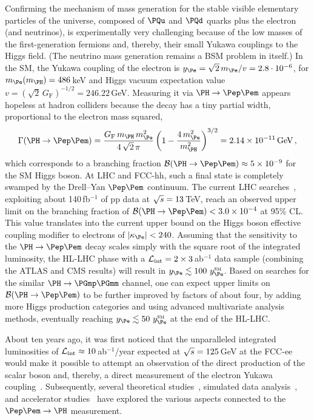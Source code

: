 Confirming the mechanism of mass generation for the stable visible elementary particles of the universe, 
composed of $\PQu$ and $\PQd$ quarks plus the electron (and neutrinos), 
is experimentally very challenging because of the low masses of the first-generation fermions and, thereby, 
their small Yukawa couplings to the Higgs field. (The neutrino mass generation remains a BSM problem in itself.) 
In the SM, the Yukawa coupling of the electron is $y_{\Pe} = \sqrt{2} \, m_{\Pe}/v = 2.8 \cdot 10^{-6}$, 
for $m_{\Pe}(m_{\PH}) = 486$\,keV and Higgs vacuum expectation value $v = ( \sqrt{2} \, G_\mathrm{F} )^{-1/2} = 246.22$\,GeV.
Measuring it via $\PH \to \Pep\Pem$ appears hopeless at hadron colliders because the decay has a tiny partial width, 
proportional to the electron mass squared,
\begin{equation}
\Gamma(\PH\to\Pep\Pem) = 
\frac{{G_\mathrm{F}} \, m_{\PH} \, m_{\Pe}^2} {4\,\sqrt{2}\,\pi}
\left(1-\frac{4\,m^2_{\Pe}}{m^2_{\PH}}\right)^{3/2} = 2.14 \times 10^{-11} \, \text{GeV} \, ,
\label{eq:Gamma_H_ee}
\end{equation}
which corresponds to a branching fraction $\mathcal{B}(\PH\to\Pep\Pem) \approx 5 \times 10^{-9}$ 
for the SM Higgs boson. 
At LHC and FCC-hh, such a final state is completely swamped by the Drell--Yan $\Pep\Pem$ continuum. 
The current LHC searches~\cite{ATLAS:2019old,CMS:2022urr}, 
exploiting about 140\,fb$^{-1}$ of pp data at $\sqrt{s} = 13$\,TeV,
reach an observed upper limit on the branching fraction 
of $\mathcal{B}(\PH\to\Pep\Pem) < 3.0 \times 10^{-4}$ at 95\% CL. 
This value translates into the current upper bound on the Higgs boson effective coupling modifier to electrons of $\lvert \kappa_{\Pe} \rvert  < 240$. 
Assuming that the sensitivity to the $\PH \to \Pep\Pem$ decay scales simply with the square root of the integrated luminosity, 
the HL-LHC phase with a $\mathcal{L}_\text{int} = 2\times 3$\,ab$^{-1}$ data sample 
(combining the ATLAS and CMS results) 
will result in $y_{\Pe} \lesssim 100 ~ y^\mathrm{\textsc{sm}}_{\Pe}$. 
Based on searches for the similar $\PH \to \PGmp\PGmm$ channel, 
one can expect upper limits on $\mathcal{B}(\PH\to\Pep\Pem)$ to be further improved by factors of about four, 
by adding more Higgs production categories and using advanced multivariate analysis methods, 
eventually reaching $y_{\Pe} \lesssim 50 ~ y^\mathrm{\textsc{sm}}_{\Pe}$ at the end of the HL-LHC.

About ten years ago, it was first noticed that the unparalleled integrated luminosities 
of $\mathcal{L}_\text{int} \approx 10$\,ab$^{-1}$/year expected at $\sqrt{s} = 125$\,GeV at the FCC-ee 
would make it possible to attempt an observation of the direct production of the scalar boson and, thereby, 
a direct measurement of the electron Yukawa coupling~\cite{dEnterria:2014,dEnterria:2017dac}. 
Subsequently, several 
theoretical studies~\cite{Jadach:2015cwa,Greco:2016izi,Dery:2017axi,Davoudiasl:2023huk,Boughezal:2024yjk}, 
simulated data analysis~\cite{dEnterria:2021xij}, 
and accelerator studies~\cite{Zimmermann:2017tjv,telnov2020monochromatizationeecolliderslarge,Faus-Golfe:2021udx} 
have explored the various aspects connected to the $\Pep\Pem\to\PH$ measurement. 

